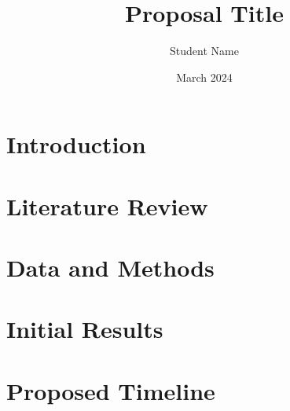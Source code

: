 \documentclass{article}
\title{Proposal Title}
\author{Student Name}
\date{March 2024}
\begin{document}
\maketitle

\section{Introduction}
\section{Literature Review}
\section{Data and Methods}
\section{Initial Results}
\section{Proposed Timeline}
\end{document}

